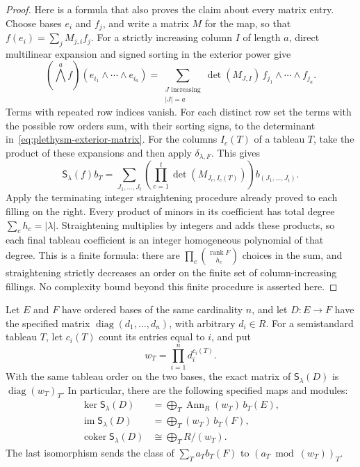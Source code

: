 \begin{proof}
Here is a formula that also proves the claim about every matrix
entry. Choose bases $e_i$ and $f_j$, and write a matrix $M$ for the
map, so that $f(e_i)=\sum_jM_{j,i}f_j$. For a strictly increasing
column $I$ of length $a$, direct multilinear expansion and signed
sorting in the exterior power give
\begin{equation}
 (\bigwedge^a f)(e_{i_1}\wedge\cdots\wedge e_{i_a})
 =\sum_{\substack{J\text{ increasing}\\|J|=a}}
       \det(M_{J,I})\,f_{j_1}\wedge\cdots\wedge f_{j_a}.
 \label{eq:plethysm-exterior-matrix}
\end{equation}
Terms with repeated row indices vanish. For each distinct row
set the terms with the possible row orders sum, with their sorting
signs, to the determinant in~\eqref{eq:plethysm-exterior-matrix}.
For the columns $I_c(T)$ of a tableau $T$, take the product of
these expansions and then apply $\delta_{\lambda,F}$. This gives
\begin{equation}
 \mathsf S_\lambda(f)b_T
 =\sum_{J_1,\ldots,J_t}
       \left(\prod_{c=1}^t\det(M_{J_c,I_c(T)})\right)
       b_{(J_1,\ldots,J_t)}.
 \label{eq:plethysm-general-matrix}
\end{equation}
Apply the terminating integer straightening procedure already
proved to each filling on the right. Every product of minors in
its coefficient has total degree $\sum_c h_c=|\lambda|$.
Straightening multiplies by integers and adds these products, so
each final tableau coefficient is an integer homogeneous
polynomial of that degree. This is a finite formula: there are
$\prod_c\binom{\operatorname{rank}F}{h_c}$ choices in the sum,
and straightening strictly decreases an order on the finite set
of column-increasing fillings. No complexity bound beyond this
finite procedure is asserted here.
\end{proof}

\begin{theorem}
\label{thm:plethysm-diagonal}
Let $E$ and $F$ have ordered bases of the same cardinality $n$,
and let $D:E\to F$ have the specified matrix
$\operatorname{diag}(d_1,\ldots,d_n)$, with arbitrary $d_i\in R$.
For a semistandard tableau $T$, let $c_i(T)$ count its entries
equal to $i$, and put
\[
 w_T=\prod_{i=1}^n d_i^{c_i(T)}.
\]
With the same tableau order on the two bases, the exact matrix of
$\mathsf S_\lambda(D)$ is $\operatorname{diag}(w_T)_T$.
In particular, there are the following specified maps and modules:
\begin{align}
 \ker\mathsf S_\lambda(D)
   &=\bigoplus_T\operatorname{Ann}_R(w_T)\,b_T(E),\\
 \operatorname{im}\mathsf S_\lambda(D)
   &=\bigoplus_T(w_T)\,b_T(F),\\
 \operatorname{coker}\mathsf S_\lambda(D)
   &\cong\bigoplus_T R/(w_T).
 \label{eq:plethysm-diagonal-modules}
\end{align}
The last isomorphism sends the class of
$\sum_T a_Tb_T(F)$ to $(a_T\bmod (w_T))_T$.
\end{theorem}

